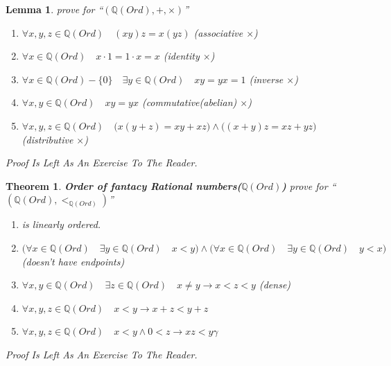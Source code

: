 \documentclass[10pt,a4paper]{book}
\newtheorem{theorem}{Theorem}[section]
\newtheorem{lemma}{Lemma}[section]
\begin{document}
\begin{lemma}prove for  ``$ (\mathbb{Q} (Ord) , + , \times  )  $''
    \begin{enumerate}
        \setlength{\itemsep}{0pt} %
        \item       $\forall x ,y ,z  \in \mathbb{Q} (Ord) \quad (x   y )  z  = x  (y   z )  $  (associative $\times$)
        \item       $\forall x \in \mathbb{Q} (Ord) \quad x \cdot 1 = 1 \cdot x = x$  (identity  $\times$)
        \item       $\forall x  \in \mathbb{Q} (Ord) - \{0\} \quad \exists y \in \mathbb{Q} (Ord) \quad x  y = y  x = 1$  (inverse  $\times$)
        \item       $\forall x ,y  \in \mathbb{Q} (Ord) \quad x   y  = y   x $  (commutative(abelian)  $\times$)
        \item       $\forall x ,y ,z  \in \mathbb{Q} (Ord) \quad \Big(x   (y  + z ) = x   y  +  x   z  \Big)
                  \land     \Big((x  + y )  z  = x   z  +  y   z  \Big)  $ (distributive $\times$)
    \end{enumerate}
    Proof Is Left As An Exercise To The Reader.
\end{lemma}

\begin{theorem}
    \textbf{Order of fantacy Rational numbers($\mathbb{Q} (Ord)$)} prove for  ``$ (\mathbb{Q} (Ord) , <_{\mathbb{Q} (Ord)}  )  $''
    \begin{enumerate}
        \setlength{\itemsep}{0pt} %
        \item        is linearly ordered.
        \item       $ \Big( \forall x \in \mathbb{Q} (Ord) \quad   \exists y \in \mathbb{Q} (Ord) \quad  x < y \Big)
                  \land \Big( \forall x \in \mathbb{Q} (Ord) \quad   \exists y \in \mathbb{Q} (Ord) \quad   y < x \Big)  $ (doesn't have endpoints)
        \item       $  \forall x,y  \in \mathbb{Q} (Ord) \quad  \exists z \in \mathbb{Q} (Ord)  \quad  x \not= y \to  x < z < y  $ (dense)
        \item       $\forall x ,y ,z \in \mathbb{Q} (Ord) \quad x  < y  \to x  + z < y  + z  $
        \item       $\forall x ,y ,z \in \mathbb{Q} (Ord) \quad x  < y  \land 0 < z \to x  z < y  \gamma   $
    \end{enumerate}
    Proof Is Left As An Exercise To The Reader.

\end{theorem}
\end{document}
